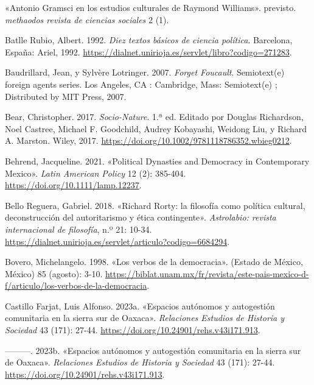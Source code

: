 \documentclass[
  letterpaper,
  DIV=11,
  numbers=noendperiod]{scrreprt}
\newlength{\cslhangindent}
\newenvironment{CSLReferences}[2] %
 {\begin{list}{}{%
  \setlength{\itemindent}{0pt}
  \setlength{\leftmargin}{0pt}
  \setlength{\parsep}{0pt}
  \ifodd #1
   \setlength{\leftmargin}{\cslhangindent}
   \setlength{\itemindent}{-1\cslhangindent}
  \fi
  \setlength{\itemsep}{#2\baselineskip}}}
 {\end{list}}
\begin{document}
\label{refs}
\begin{CSLReferences}{1}{1}
{«Antonio Gramsci en los estudios culturales de Raymond Williams»}.
previsto. \emph{methaodos revista de ciencias sociales} 2 (1).

Batlle Rubio, Albert. 1992. \emph{Diez textos básicos de ciencia
política}. Barcelona, España: Ariel, 1992.
\url{https://dialnet.unirioja.es/servlet/libro?codigo=271283}.

Baudrillard, Jean, y Sylvère Lotringer. 2007. \emph{Forget Foucault}.
Semiotext(e) foreign agents series. Los Angeles, CA : Cambridge, Mass:
Semiotext(e) ; Distributed by MIT Press, 2007.

Bear, Christopher. 2017. \emph{Socio{-}Nature}. 1.ª ed. Editado por
Douglas Richardson, Noel Castree, Michael F. Goodchild, Audrey
Kobayashi, Weidong Liu, y Richard A. Marston. Wiley, 2017.
\url{https://doi.org/10.1002/9781118786352.wbieg0212}.

Behrend, Jacqueline. 2021. {«Political Dynasties and Democracy in
Contemporary Mexico»}. \emph{Latin American Policy} 12 (2): 385-404.
\url{https://doi.org/10.1111/lamp.12237}.

Bello Reguera, Gabriel. 2018. {«Richard Rorty: la filosofía como
política cultural, deconstrucción del autoritarismo y ética
contingente»}. \emph{Astrolabio: revista internacional de filosofía},
n.º 21: 10-34.
\url{https://dialnet.unirioja.es/servlet/articulo?codigo=6684294}.

Bovero, Michelangelo. 1998. {«Los verbos de la democracia»}. (Estado de
México, México) 85 (agosto): 3-10.
\url{https://biblat.unam.mx/fr/revista/este-pais-mexico-d-f/articulo/los-verbos-de-la-democracia}.

Castillo Farjat, Luis Alfonso. 2023a. {«Espacios autónomos y autogestión
comunitaria en la sierra sur de Oaxaca»}. \emph{Relaciones Estudios de
Historia y Sociedad} 43 (171): 27-44.
\url{https://doi.org/10.24901/rehs.v43i171.913}.

---------. 2023b. {«Espacios autónomos y autogestión comunitaria en la
sierra sur de Oaxaca»}. \emph{Relaciones Estudios de Historia y
Sociedad} 43 (171): 27-44.
\url{https://doi.org/10.24901/rehs.v43i171.913}.


\end{CSLReferences}
\end{document}
